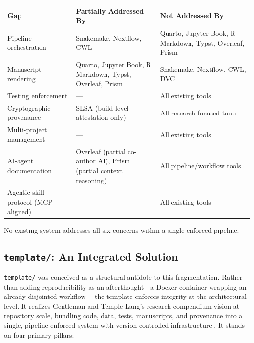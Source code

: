 \documentclass[
  english,
]{article}
\newcounter{none} %
\begin{document}
{\def\LTcaptype{none} %
\begin{longtable}[]{@{}
  >{\raggedright\arraybackslash}p{}
  >{\raggedright\arraybackslash}p{}
  >{\raggedright\arraybackslash}p{}@{}}
\toprule\noalign{}
\begin{minipage}[b]{\linewidth}\raggedright
Gap
\end{minipage} & \begin{minipage}[b]{\linewidth}\raggedright
Partially Addressed By
\end{minipage} & \begin{minipage}[b]{\linewidth}\raggedright
Not Addressed By
\end{minipage} \\
\midrule\noalign{}
\endhead
\bottomrule\noalign{}
\endlastfoot
Pipeline orchestration & Snakemake, Nextflow, CWL & Quarto, Jupyter
Book, R Markdown, Typst, Overleaf, Prism \\
Manuscript rendering & Quarto, Jupyter Book, R Markdown, Typst,
Overleaf, Prism & Snakemake, Nextflow, CWL, DVC \\
Testing enforcement & --- & All existing tools \\
Cryptographic provenance & SLSA (build-level attestation only) & All
research-focused tools \\
Multi-project management & --- & All existing tools \\
AI-agent documentation & Overleaf (partial co-author AI), Prism (partial
context reasoning) & All pipeline/workflow tools \\
Agentic skill protocol (MCP-aligned) & --- & All existing tools \\
\end{longtable}
}

No existing system addresses all six concerns within a single enforced
pipeline.

\subsection{\texorpdfstring{\texttt{template/}: An Integrated
Solution}{template/: An Integrated Solution}}\label{template-an-integrated-solution}

\texttt{template/} was conceived as a structural antidote to this
fragmentation. Rather than adding reproducibility as an afterthought---a
Docker container wrapping an already-disjointed workflow
\citep{boettiger2015docker}---the template enforces integrity at the
architectural level. It realizes Gentleman and Temple Lang's research
compendium vision \citep{gentleman2007research} at repository scale,
bundling code, data, tests, manuscripts, and provenance into a single,
pipeline-enforced system with version-controlled infrastructure
\citep{ram2013git}. It stands on four primary pillars:
\end{document}
